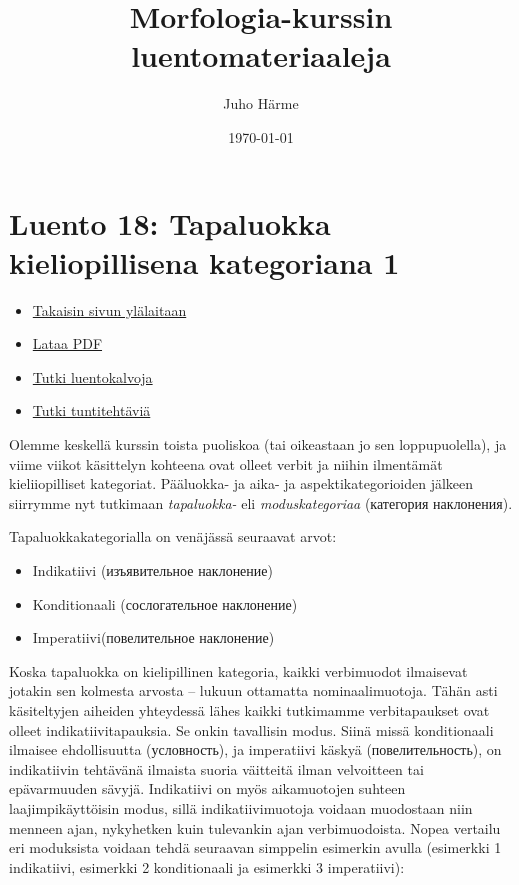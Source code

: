 \documentclass[]{scrartcl}
\author{Juho Härme}
\title{Morfologia-kurssin luentomateriaaleja}
\date{\today}
\providecommand{\tightlist}{%
  \setlength{\itemsep}{0pt}\setlength{\parskip}{0pt}}
\begin{document}
\maketitle
\tableofcontents
\newpage



\section{Luento 18: Tapaluokka kieliopillisena kategoriana
1}\label{luento-18-tapaluokka-kieliopillisena-kategoriana-1}

\begin{itemize}
\tightlist
\item
  \href{https://mustikka.uta.fi/~juho_harme/morfologia/\#tästä-kurssista}{Takaisin
  sivun ylälaitaan}
\item
  \href{http://mustikka.uta.fi/~juho_harme/morfologia/materiaalit/luento18.pdf}{Lataa
  PDF}
\item
  \href{http://mustikka.uta.fi/~juho_harme/morfologia/presentations/luento18.html}{Tutki
  luentokalvoja}
\item
  \href{http://mustikka.uta.fi/~juho_harme/morfologia/tehtavat/luento18.pdf}{Tutki
  tuntitehtäviä}
\end{itemize}

Olemme keskellä kurssin toista puoliskoa (tai oikeastaan jo sen
loppupuolella), ja viime viikot käsittelyn kohteena ovat olleet verbit
ja niihin ilmentämät kieliiopilliset kategoriat. Pääluokka- ja aika- ja
aspektikategorioiden jälkeen siirrymme nyt tutkimaan \emph{tapaluokka-}
eli \emph{moduskategoriaa} (категория наклонения).

Tapaluokkakategorialla on venäjässä seuraavat arvot:

\begin{itemize}
\tightlist
\item
  Indikatiivi (изъявительное наклонение)
\item
  Konditionaali (сослогательное наклонение)
\item
  Imperatiivi(повелительное наклонение)
\end{itemize}

Koska tapaluokka on kielipillinen kategoria, kaikki verbimuodot
ilmaisevat jotakin sen kolmesta arvosta -- lukuun ottamatta
nominaalimuotoja. Tähän asti käsiteltyjen aiheiden yhteydessä lähes
kaikki tutkimamme verbitapaukset ovat olleet indikatiivitapauksia. Se
onkin tavallisin modus. Siinä missä konditionaali ilmaisee ehdollisuutta
(условность), ja imperatiivi käskyä (повелительность), on indikatiivin
tehtävänä ilmaista suoria väitteitä ilman velvoitteen tai epävarmuuden
sävyjä. Indikatiivi on myös aikamuotojen suhteen laajimpikäyttöisin
modus, sillä indikatiivimuotoja voidaan muodostaan niin menneen ajan,
nykyhetken kuin tulevankin ajan verbimuodoista. Nopea vertailu eri
moduksista voidaan tehdä seuraavan simppelin esimerkin avulla (esimerkki
1 indikatiivi, esimerkki 2 konditionaali ja esimerkki 3 imperatiivi):
\end{document}
